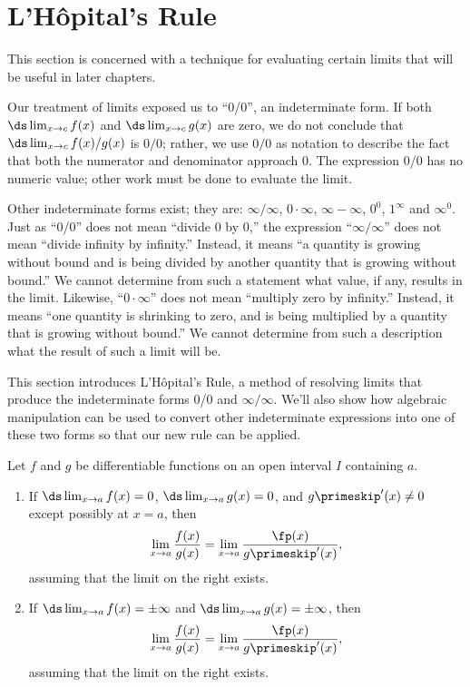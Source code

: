 \section{L'Hôpital's Rule}\label{sec:lhopitals_rule}

This section is concerned with a technique for evaluating certain limits that will be useful in later chapters.

Our treatment of limits exposed us to ``0/0'', an indeterminate form. If both $\ds \lim_{x\to c}f(x)$ and $\ds \lim_{x\to c} g(x)$ are zero, we do not conclude that $\ds \lim_{x\to c} f(x)/g(x)$ is $0/0$; rather, we use $0/0$ as notation to describe the fact that both the numerator and denominator approach 0. The expression 0/0 has no numeric value; other work must be done to evaluate the limit.

Other indeterminate forms exist; they are: $\infty/\infty$, $0\cdot\infty$, $\infty-\infty$, $0^0$, $1^\infty$ and $\infty^0$. Just as ``0/0'' does not mean ``divide 0 by 0,'' the expression ``$\infty/\infty$'' does not mean ``divide infinity by infinity.'' Instead, it means ``a quantity is growing without bound and is being divided by another quantity that is growing without bound.'' We cannot determine from such a statement what value, if any, results in the limit. Likewise, ``$0\cdot \infty$'' does not mean ``multiply zero by infinity.'' Instead, it means ``one quantity is shrinking to zero, and is being multiplied by a quantity that is growing without bound.'' We cannot determine from such a description what the result of such a limit will be.

This section introduces L'Hôpital's Rule, a method of resolving limits that produce the indeterminate forms 0/0 and $\infty/\infty$. We'll also show how algebraic manipulation can be used to convert other indeterminate expressions into one of these two forms so that our new rule can be applied.

\begin{theorem}\label{thm:LHR_1}
Let $f$ and $g$ be differentiable functions on an open interval $I$ containing $a$.
\begin{enumerate}
\item If $\ds\lim_{x\to a}f(x)=0$, $\ds\lim_{x\to a}g(x)=0$, and $g\primeskip'(x)\neq 0$ except possibly at $x=a$, then \[\lim_{x\to a}\frac{f(x)}{g(x)}=\lim_{x\to a} \frac{\fp(x)}{g\primeskip'(x)},\]
assuming that the limit on the right exists.
\item If  $\ds\lim_{x\to a}f(x)=\pm\infty$ and $\ds\lim_{x\to a}g(x)=\pm\infty$, then \[\lim_{x\to a}\frac{f(x)}{g(x)}=\lim_{x\to a} \frac{\fp(x)}{g\primeskip'(x)},\]
assuming that the limit on the right exists.
\end{enumerate}
\end{theorem}

